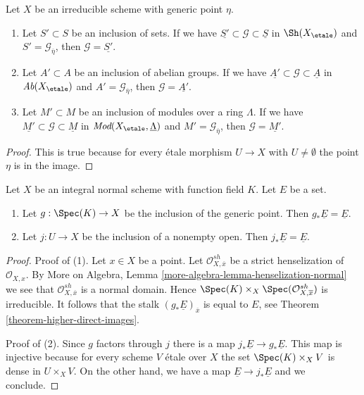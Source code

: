\begin{lemma}
\label{lemma-irreducible-subsheaf-constant-zero}
Let $X$ be an irreducible scheme with generic point $\eta$.
\begin{enumerate}
\item Let $S' \subset S$ be an inclusion of sets. If we have
$\underline{S'} \subset \mathcal{G} \subset \underline{S}$
in $\Sh(X_\etale)$ and $S' = \mathcal{G}_{\overline{\eta}}$, then
$\mathcal{G} = \underline{S'}$.
\item Let $A' \subset A$ be an inclusion of abelian groups. If we have
$\underline{A'} \subset \mathcal{G} \subset \underline{A}$
in $\textit{Ab}(X_\etale)$ and $A' = \mathcal{G}_{\overline{\eta}}$, then
$\mathcal{G} = \underline{A'}$.
\item Let $M' \subset M$ be an inclusion of modules over a ring $\Lambda$.
If we have $\underline{M'} \subset \mathcal{G} \subset \underline{M}$
in $\textit{Mod}(X_\etale, \underline{\Lambda})$
and $M' = \mathcal{G}_{\overline{\eta}}$, then
$\mathcal{G} = \underline{M'}$.
\end{enumerate}
\end{lemma}

\begin{proof}
This is true because for every \'etale morphism $U \to X$
with $U \not = \emptyset$ the point $\eta$ is in the image.
\end{proof}

\begin{lemma}
\label{lemma-push-constant-sheaf-from-open}
Let $X$ be an integral normal scheme with function field $K$.
Let $E$ be a set.
\begin{enumerate}
\item Let $g : \Spec(K) \to X$ be the inclusion of the generic point.
Then $g_*\underline{E} = \underline{E}$.
\item Let $j : U \to X$ be the inclusion of a nonempty open. Then
$j_*\underline{E} = \underline{E}$.
\end{enumerate}
\end{lemma}

\begin{proof}
Proof of (1). Let $x \in X$ be a point. Let
$\mathcal{O}^{sh}_{X, \overline{x}}$
be a strict henselization of $\mathcal{O}_{X, x}$. 
By More on Algebra, Lemma \ref{more-algebra-lemma-henselization-normal}
we see that $\mathcal{O}^{sh}_{X, \overline{x}}$ is a normal domain.
Hence $\Spec(K) \times_X \Spec(\mathcal{O}^{sh}_{X, \overline{x}})$
is irreducible. It follows that
the stalk $(g_*\underline{E})_{\overline{x}}$ is equal to $E$,
see Theorem \ref{theorem-higher-direct-images}.

\medskip\noindent
Proof of (2). Since $g$ factors through $j$ there is a map
$j_*\underline{E} \to g_*\underline{E}$. This map is injective because
for every scheme $V$ \'etale over $X$ the set $\Spec(K) \times_X V$
is dense in $U \times_X V$. On the other hand, we have a map
$\underline{E} \to j_*\underline{E}$ and we conclude.
\end{proof}

